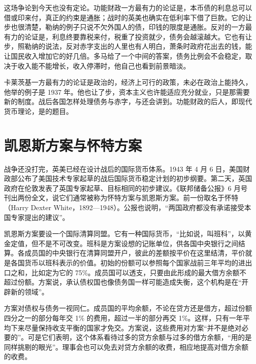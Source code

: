 这场争论到今天也没有定论。功能财政一方最有力的论证是，本币债的利息总可以借或印来付，真正的约束是通胀；战时的英美也确实在低利率下借了巨款。它的让步也很清楚，勒纳的例子只说不欠外国人的债，印钱的限度是通胀。反对的一方最有力的论证是，利息终要靠税来付，税重了投资就少，债务会越滚越大。它也有让步，照勒纳的说法，反对赤字支出的人里也有人明白，萧条时政府花出去的钱，能让国民收入增加它的好几倍\cite{lerner1943}。多马给了一个中间的答案，债务比例会不会稳定，取决于收入能不能增长，收入停滞时，他自己也看到前景暗淡。

卡莱茨基一方最有力的论证是政治的，经济上可行的政策，未必在政治上能持久，他举的例子是 1937 年。他也让了步，资本主义也许能适应充分就业，只是那需要新的制度。战后各国怎样处理债务与赤字，与还会讲到。功能财政的后人，即现代货币理论，是的题目。

\section{凯恩斯方案与怀特方案}\label{sec:warfinance-plans}

战争还没打完，英美已经在设计战后的国际货币体系。1943 年 4 月 6 日，美国财政部公布了美国技术专家起草的战后国际货币稳定计划的初步纲要\cite{frb1943}。第二天，英国政府在伦敦发表了英国专家起草、目标相同的初步建议\cite{frb1943}。《联邦储备公报》6 月号刊出两份全文，说它们通常被称为怀特方案与凯恩斯方案\cite{frb1943}。前一份取名于怀特（Harry Dexter White，1892—1948）\cite{loc34}。公报也说明，“两国政府都没有承诺接受本国专家提出的建议”\cite{frb1943}。

凯恩斯方案要设一个国际清算同盟。它有一种国际货币，“比如说，叫班科”，以黄金定值，但不是不可改变\cite{frb1943}。班科是方案设想的记账单位，供各国中央银行之间结算。各成员国的中央银行在清算同盟开户，彼此的差额按平价在这里结清，平价就是各国货币以班科表示的价值\cite{frb1943}。初始的份额可以参照每个国家战前三年平均的进出口之和，比如定为它的 75\%\cite{frb1943}。成员国可以透支，只要由此形成的最大借方余额不超过份额\cite{frb1943}。方案说，承认债权国也像债务国一样可能造成失衡，这个机构是在“开辟新的领域”\cite{frb1943}。

方案对债权与债务一视同仁。成员国的平均余额，不论在贷方还是借方，超过份额四分之一的部分每年交 1\% 的费用，超过一半的部分再交 1\%\cite{frb1943}。这样，只有一年平均下来尽量保持收支平衡的国家才免交\cite{frb1943}。方案说，这些费用对方案“并不是绝对必要的”。可是它们表明，这个体系看待过多的贷方余额与过多的借方余额，“用的是同样挑剔的眼光”\cite{frb1943}。理事会也可以免去对贷方余额的收费，相应地提高对借方余额的收费\cite{frb1943}。


